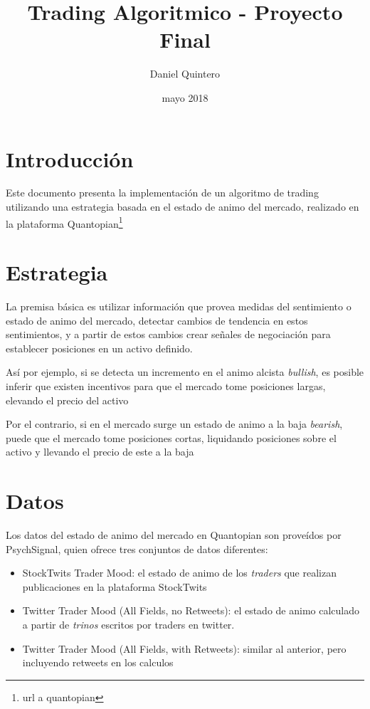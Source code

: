 \documentclass[a4paper, 11pt, twocolumn]{article}
\title{Trading Algoritmico - Proyecto Final}
\author{Daniel Quintero}
\date{mayo 2018}
\begin{document}
\maketitle

\section{Introducción}
Este documento presenta la implementación de un algoritmo de trading utilizando una estrategia basada en el estado de animo del mercado, realizado en la plataforma Quantopian\footnote{url a quantopian}

\section{Estrategia}
La premisa básica es utilizar información que provea medidas del sentimiento o estado de animo del mercado, detectar cambios de tendencia en estos sentimientos, y a partir de estos cambios crear señales de negociación para establecer posiciones en un activo definido.

Así por ejemplo, si se detecta un incremento en el animo alcista \textit{bullish}, es posible inferir que existen incentivos para que el mercado tome posiciones largas, elevando el precio del activo

Por el contrario, si en el mercado surge un estado de animo a la baja \textit{bearish}, puede que el mercado tome posiciones cortas, liquidando posiciones sobre el activo y llevando el precio de este a la baja

\section{Datos}
Los datos del estado de animo del mercado en Quantopian son proveídos por PsychSignal, quien ofrece tres conjuntos de datos diferentes:

\begin{itemize}
    \item StockTwits Trader Mood: el estado de animo de los \textit{traders} que realizan publicaciones en la plataforma StockTwits
    \item Twitter Trader Mood (All Fields, no Retweets): el estado de animo calculado a partir de \textit{trinos} escritos por traders en twitter.
    \item Twitter Trader Mood (All Fields, with Retweets): similar al anterior, pero incluyendo retweets en los calculos
\end{itemize}
\end{document}
